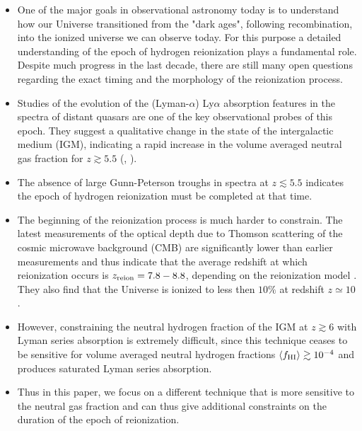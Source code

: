 \documentclass[iop]{emulateapj}
\newcommand{\lya} {Ly$\alpha$\xspace}
\begin{document}
\begin{itemize}
\item One of the major goals in observational astronomy today is to understand how our Universe transitioned from the "dark ages", following recombination, into the ionized universe we can observe today. For this purpose a detailed understanding of the epoch of hydrogen reionization plays a fundamental role. Despite much progress in the last decade, there are still many open questions regarding the exact timing and the morphology of the reionization process. 
\item Studies of the evolution of the (Lyman-$\alpha$) \lya absorption features in the spectra of distant quasars are one of the key observational probes of this epoch. They suggest a qualitative change in the state of the intergalactic medium (IGM), indicating a rapid increase in the volume averaged neutral gas fraction for $z\gtrsim 5.5$ (\citet{Fan2006}, \citet{Becker2015}). 
\item The absence of large Gunn-Peterson troughs in spectra at $z\lesssim 5.5$ indicates the epoch of hydrogen reionization must be completed at that time. %
\item The beginning of the reionization process is much harder to constrain. The latest measurements of the optical depth due to Thomson scattering of the cosmic microwave background (CMB) are significantly lower than earlier measurements and thus indicate that the average redshift at which reionization occurs is $z_{\rm reion}= 7.8-8.8$, depending on the reionization model \citep{Planck2016}. They also find that the Universe is ionized to less then $10\%$ at redshift $z\simeq 10$. 
\item However, constraining the neutral hydrogen fraction of the IGM at $z\gtrsim 6$ with Lyman series absorption is extremely difficult, since this technique ceases to be sensitive for volume averaged neutral hydrogen fractions $\langle f_{\rm HI}\rangle \gtrsim 10^{-4}$ and produces saturated Lyman series absorption. 
\item Thus in this paper, we focus on a different technique that is more sensitive to the neutral gas fraction and can thus give additional constraints on the duration of the epoch of reionization. 

\end{itemize}
\end{document}
